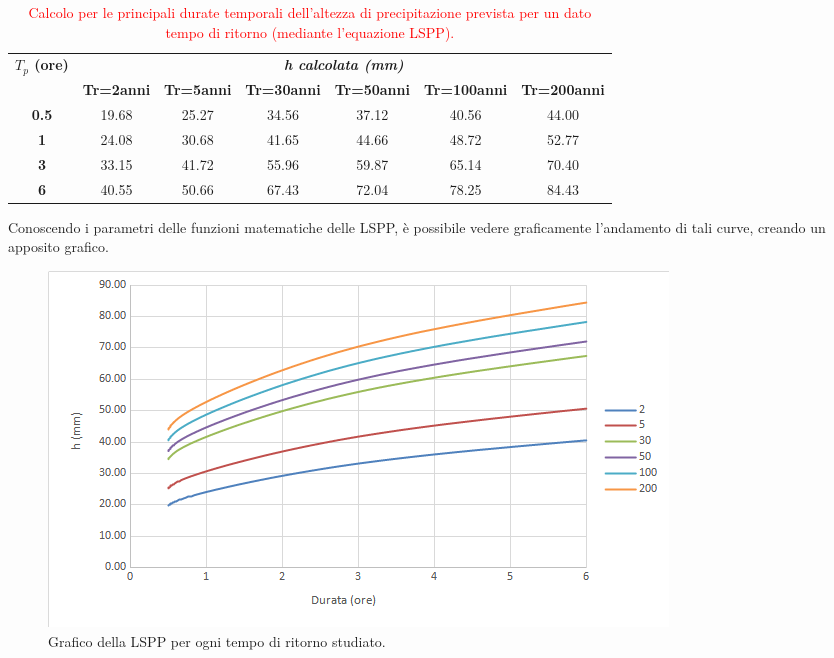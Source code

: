 \begin{table}[H]\centering
    \caption{\textcolor{red}{Calcolo per le principali durate temporali dell'altezza di precipitazione prevista per un dato tempo di ritorno (mediante l'equazione LSPP).}}
    \begin{tabular}{ccccccc}
        \toprule
    \multirow{2}{*}{\textbf{$T_p$ (ore)}} & \multicolumn{6}{c}{\textit{\textbf{h calcolata (mm)}}}  \\
    & \textbf{Tr=2anni} & \textbf{Tr=5anni} & \textbf{Tr=30anni} & \textbf{Tr=50anni} & \textbf{Tr=100anni} & \textbf{Tr=200anni} \\
    \textbf{0.5}                           & 19.68                & 25.27                & 34.56                 & 37.12                 & 40.56                  & 44.00                  \\
    \textbf{1}                             & 24.08                & 30.68                & 41.65                 & 44.66                 & 48.72                  & 52.77                  \\
    \textbf{3}                             & 33.15                & 41.72                & 55.96                 & 59.87                 & 65.14                  & 70.40                  \\
    \textbf{6}                             & 40.55                & 50.66                & 67.43                 & 72.04                 & 78.25                  & 84.43           \\
    \bottomrule      
    \end{tabular}
    \end{table}

Conoscendo i parametri delle funzioni matematiche delle LSPP, è possibile vedere graficamente l'andamento di tali curve, creando un apposito grafico.

\begin{figure}[H]\centering
        \includegraphics[scale=.75]{immagini/LSPP.png}
        \caption{Grafico della LSPP per ogni tempo di ritorno studiato.}
      \label{LSPP}
\end{figure}

